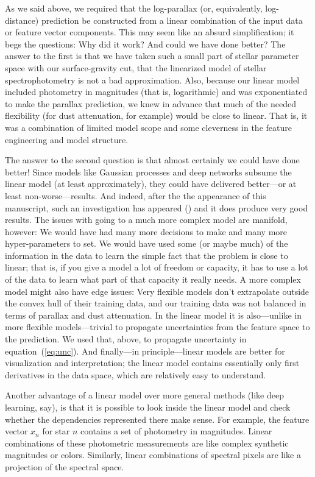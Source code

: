 \documentclass[modern]{aastex62}
\newcommand{\equationname}{equation}
\begin{document}
As we said above,
we required that the log-parallax (or, equivalently, log-distance)
prediction be constructed from a linear combination
of the input data or feature vector components.
This may seem like an absurd simplification; it begs the questions:
Why did it work? And could we have done better?
The answer to the first is that we have taken such a small part of stellar parameter
space with our surface-gravity cut, that the linearized model of stellar
spectrophotometry is not a bad approximation.
Also, because our linear model included photometry in magnitudes (that is, logarithmic)
and was exponentiated to make the parallax prediction, we knew in advance that much
of the needed flexibility (for dust attenuation, for example) would be close to
linear.
That is, it was a combination of limited model scope and some cleverness in the
feature engineering and model structure.

The answer to the second question is that almost certainly we could have done better!
Since models like Gaussian processes and deep networks subsume the linear model
(at least approximately), they could have delivered better---or at least non-worse---results.
And indeed, after the the appearance of this manuscript, such an investigation
has appeared (\citealt{leung}) and it does produce very good results.
The issues with going to a much more complex model are manifold, however:
We would have had many more decisions to make and many more hyper-parameters
to set.
We would have used some (or maybe much) of the information in the data to learn
the simple fact that the problem is close to linear; that is, if you give a model
a lot of freedom or capacity, it has to use a lot of the data to learn what part
of that capacity it really needs.
A more complex model might also have edge issues: Very flexible models don't extrapolate
outside the convex hull of their training data, and our training data was not
balanced in terms of parallax and dust attenuation.
In the  linear model it is also---unlike in more flexible models---trivial to propagate
uncertainties from the feature space to the prediction.
We used that, above, to propagate uncertainty in \equationname~(\ref{eq:unc}).
And finally---in principle---linear models are better for visualization and interpretation;
the linear model contains essentially only first derivatives in the data space, which are
relatively easy to understand.

Another  advantage of a linear model over more general methods (like deep learning, say),
is that it is possible to look inside
the linear model and check whether the dependencies represented there make sense.
For example, the feature vector $x_n$ for star $n$
contains a set of photometry in magnitudes.
Linear combinations of these photometric measurements are like complex synthetic
magnitudes or colors.
Similarly, linear combinations of spectral pixels are like a projection of the spectral space.
\end{document}
